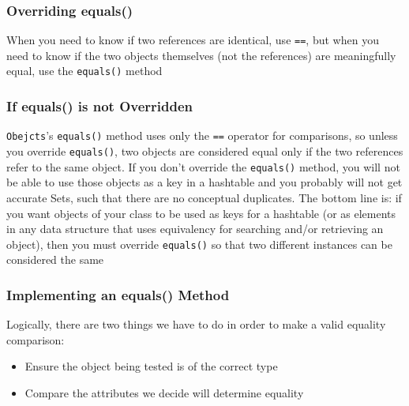 \subsubsection{Overriding equals()}
When you need to know if two references are identical, use \verb#==#, but when 
you need to know if the two objects themselves (not the references) are 
meaningfully equal, use the \verb#equals()# method

\subsubsection{If equals() is not Overridden}
\verb#Obejcts#'s \verb#equals()# method uses only the \verb#==# operator for 
comparisons, so unless you override \verb#equals()#, two objects are considered 
equal only if the two references refer to the same object. If you don't 
override the \verb#equals()# method, you will not be able to use those objects 
as a key in a hashtable and you probably will not get accurate Sets, such that 
there are no conceptual duplicates. The bottom line is: if you want objects of 
your class to be used as keys for a hashtable (or as elements in any data 
structure that uses equivalency for searching and/or retrieving an object), 
then you must override \verb#equals()# so that two different instances can be 
considered the same

\subsubsection{Implementing an equals() Method}
Logically, there are two things we have to do in order to make a valid equality 
comparison:
\begin{itemize}
    \item Ensure the object being tested is of the correct type
    \item Compare the attributes we decide will determine equality
\end{itemize}

